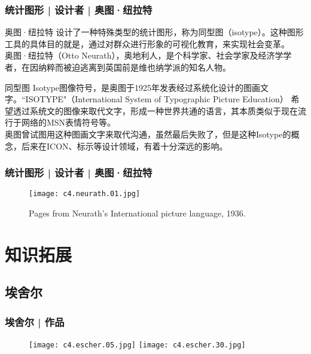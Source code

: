 \begin{frame}
  \frametitle{统计图形 | 设计者 | 奥图·纽拉特}
  \begin{block}{奥图·纽拉特}
    设计了一种特殊类型的统计图形，称为同型图（isotype）。这种图形工具的具体目的就是，通过对群众进行形象的可视化教育，来实现社会变革。\\
    \vspace{0.5em}
奥图·纽拉特（Otto Neurath），奥地利人，是个科学家、社会学家及经济学学者，在因纳粹而被迫逃离到英国前是维也纳学派的知名人物。    
  \end{block}
  \pause
  \begin{block}{同型图}
    Isotype图像符号，是奥图于1925年发表经过系统化设计的图画文字。``ISOTYPE"（International System of Typographic Picture Education） 希望透过系统文的图像来取代文字，形成一种世界共通的语言，其本质类似于现在流行于网络的MSN表情符号等。\\
    \vspace{0.5em}
    奥图曾试图用这种图画文字来取代沟通，虽然最后失败了，但是这种Isotype的概念，后来在ICON、标示等设计领域，有着十分深远的影响。
  \end{block}
\end{frame}

\begin{frame}
  \frametitle{统计图形 | 设计者 | 奥图·纽拉特}
  \begin{figure}
    \centering
    \texttt{[image: c4.neurath.01.jpg]}
    \caption{Pages from Neurath's International picture language, 1936.}
  \end{figure}
\end{frame}


















\section{知识拓展}
\subsection{埃舍尔}
\begin{frame}
  \frametitle{埃舍尔 | 作品}
  \begin{figure}
    \centering
    \texttt{[image: c4.escher.05.jpg]}\quad
    \texttt{[image: c4.escher.30.jpg]}
  \end{figure}
\end{frame}

